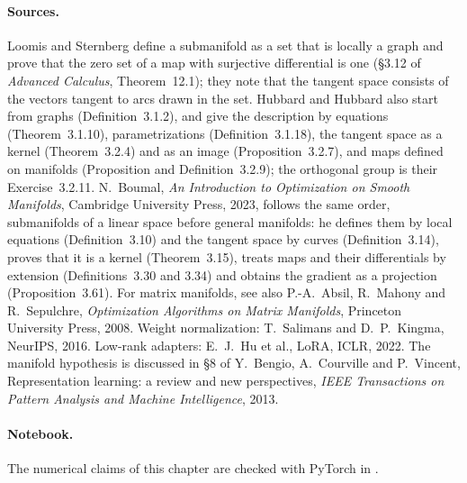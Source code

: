 \begin{notechapter}
\paragraph{Sources.} Loomis and Sternberg define a submanifold as a set
that is locally a graph and prove that the zero set of a map with
surjective differential is one (\S3.12 of \emph{Advanced Calculus},
Theorem~12.1); they note that the tangent space consists of the vectors
tangent to arcs drawn in the set.
Hubbard and Hubbard also start from graphs (Definition~3.1.2), and give
the description by equations (Theorem~3.1.10), parametrizations
(Definition~3.1.18), the tangent space as a kernel (Theorem~3.2.4) and
as an image (Proposition~3.2.7), and maps defined on manifolds
(Proposition and Definition~3.2.9); the orthogonal group is their
Exercise~3.2.11. N.~Boumal, \emph{An Introduction to Optimization on
Smooth Manifolds}, Cambridge University Press, 2023, follows the same
order, submanifolds of a linear space before general manifolds: he
defines them by local equations (Definition~3.10) and the tangent space
by curves (Definition~3.14), proves that it is a kernel (Theorem~3.15),
treats maps and their differentials by extension (Definitions~3.30 and
3.34) and obtains the gradient as a projection (Proposition~3.61). For
matrix manifolds, see also P.-A.~Absil, R.~Mahony and R.~Sepulchre,
\emph{Optimization Algorithms on Matrix Manifolds}, Princeton University
Press, 2008.
Weight normalization: T.~Salimans and D.~P.~Kingma, NeurIPS, 2016.
Low-rank adapters: E.~J.~Hu et al., LoRA, ICLR, 2022. The manifold
hypothesis is discussed in \S8 of Y.~Bengio, A.~Courville and
P.~Vincent, Representation learning: a review and new perspectives,
\emph{IEEE Transactions on Pattern Analysis and Machine Intelligence},
2013.

\paragraph{Notebook.} The numerical claims of this chapter are checked
with PyTorch in .


\end{notechapter}
